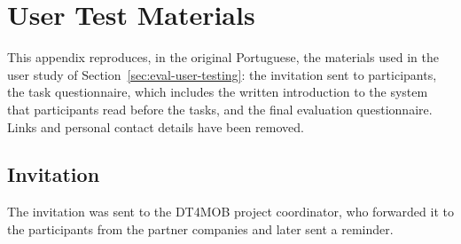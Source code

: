 \chapter{User Test Materials}
\label{chap:appendix-user-test}

This appendix reproduces, in the original Portuguese, the materials used in the user study of Section~\ref{sec:eval-user-testing}: the invitation sent to participants, the task questionnaire, which includes the written introduction to the system that participants read before the tasks, and the final evaluation questionnaire. Links and personal contact details have been removed.

\section{Invitation}
\label{sec:appendix-invitation}

The invitation was sent to the DT4MOB project coordinator, who forwarded it to the participants from the partner companies and later sent a reminder.

